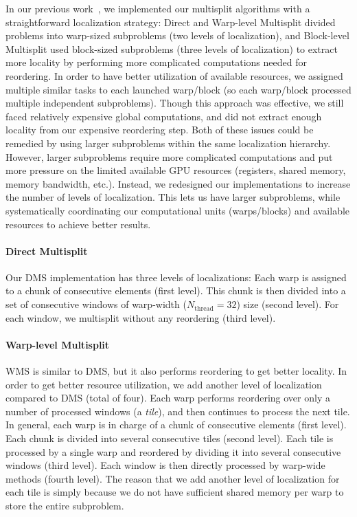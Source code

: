 In our previous work~\cite{Ashkiani:2016:GM}, we implemented our multisplit algorithms with a straightforward localization strategy: Direct and Warp-level Multisplit divided problems into warp-sized subproblems (two levels of localization), and Block-level Multisplit used block-sized subproblems (three levels of localization) to extract more locality by performing more complicated computations needed for reordering.
In order to have better utilization of available resources, we assigned multiple similar tasks to each launched warp/block (so each warp/block processed multiple independent subproblems).
Though this approach was effective, we still faced relatively expensive global computations, and did not extract enough locality from our expensive reordering step.
Both of these issues could be remedied by using larger subproblems within the same localization hierarchy. However, larger subproblems require more complicated computations and put more pressure on the limited available GPU resources (registers, shared memory, memory bandwidth, etc.). Instead, we redesigned our implementations to increase the number of levels of localization. This lets us have larger subproblems, while systematically coordinating our computational units (warps/blocks) and available resources to achieve better results.

\paragraph{Direct Multisplit} Our DMS implementation has three levels of localizations: 
Each warp is assigned to a chunk of consecutive elements (first level).
This chunk is then divided into a set of consecutive windows of warp-width ($N_\text{thread}=32$) size (second level).
For each window, we multisplit without any reordering (third level).
\paragraph{Warp-level Multisplit} WMS is similar to DMS, but it also performs reordering to get better locality. In order to get better resource utilization, we add another level of localization compared to DMS (total of four). Each warp performs reordering over only a number of processed windows (a \emph{tile}), and then continues to process the next tile. In general, each warp is in charge of a chunk of consecutive elements (first level). Each chunk is divided into several consecutive tiles (second level). Each tile is processed by a single warp and reordered by dividing it into several consecutive windows (third level). Each window is then directly processed by warp-wide methods (fourth level).
The reason that we add another level of localization for each tile is simply because we do not have sufficient shared memory per warp to store the entire subproblem.

